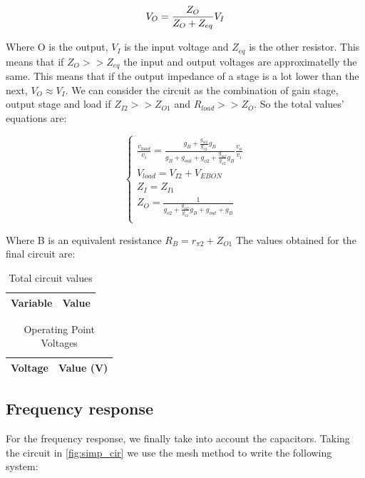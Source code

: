 \begin{equation}\label{eq:approx}
V_O=\frac{Z_O}{Z_O+Z_{eq}}V_I\\
\end{equation}

 Where O is the output, $V_I$ is the input voltage and $Z_{eq}$ is the other resistor. This means that if $Z_O >> Z_{eq}$ the input and output voltages are approximatelly the same. This means that if the output impedance of a stage is a lot lower than the next, $V_O\approx V_I$. We can consider the circuit as the combination of gain stage, output stage and load if $Z_{I2} >> Z_{O1}$ and $R_{load} >> Z_{O}$. So the total values' equations are:
 
\begin{equation}\label{eq:final}
\begin{cases}
\frac{v_{load}}{v_i}=\frac{g_B+\frac{g_{m2}}{g_{\pi 2}} g_B}{g_B+g_{out}+g_{o2}+\frac{g_{m2}}{g_{\pi 2}} g_B} \frac{v_o}{v_i}\\
V_{load}=V_{I2}+ V_{EBON}\\
Z_I=Z_{I1}\\
Z_O=\frac{1}{g_{o2}+\frac{g_{m2}}{g_{\pi 2}} g_B+g_{out}+g_B}\\
\end{cases}
\end{equation}

Where B is an equivalent resistance $R_B=r_{\pi 2} + Z_{O1}$
The values obtained for the final circuit are:

\begin{table}[H]
  \centering
  \begin{tabular}{|l|r|}
    \hline    
    {\bf Variable} & {\bf Value} \\ \hline
    
  \end{tabular}
  \caption{Total circuit values}
  \label{tab:sim1}
\end{table}

\begin{table}[H]
  \centering
  \begin{tabular}{|l|r|}
    \hline    
    {\bf Voltage} & {\bf Value (V)} \\ \hline
    
  \end{tabular}
  \caption{Operating Point Voltages}
  \label{tab:OP}
\end{table}

\subsection{Frequency response}
For the frequency response, we finally take into account the capacitors. Taking the circuit in \ref{fig:simp_cir} we use the mesh method to write the following system:

